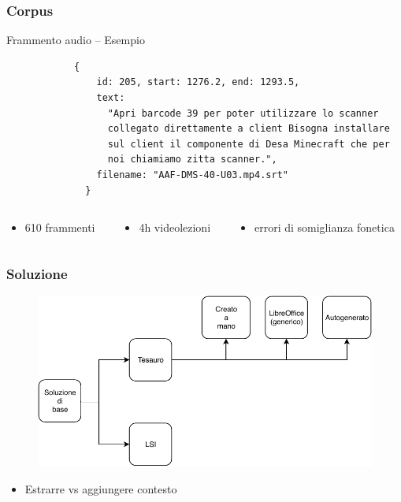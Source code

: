 \documentclass{beamer}
\begin{document}
	\begin{frame}[fragile]
		\frametitle{Corpus}
		\vspace*{-1em}
		\begin{exampleblock}{Frammento audio -- Esempio}
		\begin{verbatim}
			{
				id: 205, start: 1276.2, end: 1293.5,
				text:
				  "Apri barcode 39 per poter utilizzare lo scanner 
				  collegato direttamente a client Bisogna installare 
				  sul client il componente di Desa Minecraft che per 
				  noi chiamiamo zitta scanner.",
				filename: "AAF-DMS-40-U03.mp4.srt"
			  }
		\end{verbatim}
	\end{exampleblock}
	\begin{columns}[T]
		\begin{column}{0.29\textwidth}
			\begin{itemize}
				\item 610 frammenti 
			\end{itemize}
		\end{column}
		\begin{column}{0.29\textwidth}
			\begin{itemize}
				\item 4h videolezioni
			\end{itemize}
		\end{column}
		\begin{column}{0.5\textwidth}
			\begin{itemize}
				\item errori di somiglianza fonetica
			\end{itemize}
		\end{column}
	\end{columns}
	\end{frame}

	\begin{frame}
		\frametitle{Soluzione}
		\begin{figure}
			\centering
			\includegraphics[width=\textwidth]{img/schema-soluzione.pdf}
		\end{figure}
		\begin{itemize}
			\item Estrarre vs aggiungere contesto
		\end{itemize}	
	\end{frame}
\end{document}
